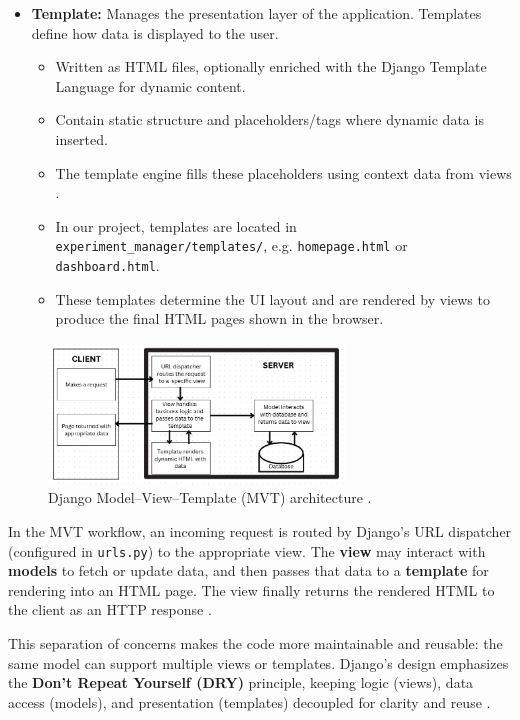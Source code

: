\begin{itemize}
	\item \textbf{Template:} Manages the presentation layer of the application. Templates define how data is displayed to the user.
	\begin{itemize}
		\item Written as HTML files, optionally enriched with the Django Template Language for dynamic content. 
		\item Contain static structure and placeholders/tags where dynamic data is inserted. 
		\item The template engine fills these placeholders using context data from views \parencite{DjangoTemplates}. 
		\item In our project, templates are located in \texttt{experiment\_manager/templates/}, e.g. \texttt{homepage.html} or \texttt{dashboard.html}. 
		\item These templates determine the UI layout and are rendered by views to produce the final HTML pages shown in the browser. 
	\end{itemize}
\end{itemize}

\begin{figure}[h]
	\centering
	\includegraphics[width=0.7\textwidth]{img/chpt3/django_mvt_diagram.png}
	\caption{Django Model–View–Template (MVT) architecture \parencite{freecodecamp_mvt}.}
\end{figure}

In the MVT workflow, an incoming request is routed by Django’s URL dispatcher (configured in \texttt{urls.py}) to the appropriate view. The \textbf{view} may interact with \textbf{models} to fetch or update data, and then passes that data to a \textbf{template} for rendering into an HTML page. The view finally returns the rendered HTML to the client as an HTTP response \parencite{DjangoRequestResponse,DjangoURLDispatcher}. 

This separation of concerns makes the code more maintainable and reusable: the same model can support multiple views or templates. Django’s design emphasizes the \textbf{Don’t Repeat Yourself (DRY)} principle, keeping logic (views), data access (models), and presentation (templates) decoupled for clarity and reuse \parencite{DjangoPhilosophy}.

